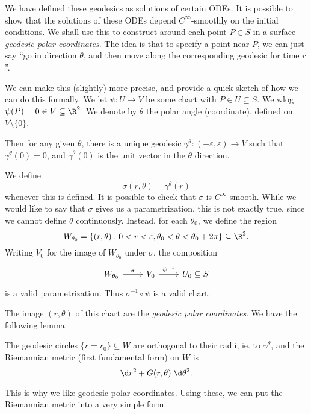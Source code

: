 \documentclass[a4paper]{article}
\begin{document}
We have defined these geodesics as solutions of certain ODEs. It is possible to show that the solutions of these ODEs depend $C^\infty$-smoothly on the initial conditions. We shall use this to construct around each point $P \in S$ in a surface \emph{geodesic polar coordinates}. The idea is that to specify a point near $P$, we can just say ``go in direction $\theta$, and then move along the corresponding geodesic for time $r$''.

We can make this (slightly) more precise, and provide a quick sketch of how we can do this formally. We let $\psi: U \to V$ be some chart with $P \in U \subseteq S$. We wlog $\psi(P) = 0 \in V \subseteq \R^2$. We denote by $\theta$ the polar angle (coordinate), defined on $V \setminus \{0\}$.
\begin{center}
\end{center}
Then for any given $\theta$, there is a unique geodesic $\gamma^{\theta}: (-\varepsilon, \varepsilon) \to V$ such that $\gamma^{\theta}(0) = 0$, and $\dot{\gamma}^\theta(0)$ is the unit vector in the $\theta$ direction.

We define
\[
  \sigma(r, \theta) = \gamma^\theta(r)
\]
whenever this is defined. It is possible to check that $\sigma$ is $C^\infty$-smooth. While we would like to say that $\sigma$ gives us a parametrization, this is not exactly true, since we cannot define $\theta$ continuously. Instead, for each $\theta_0$, we define the region
\[
  W_{\theta_0} = \{(r, \theta): 0 < r < \varepsilon, \theta_0 < \theta < \theta_0 + 2\pi\} \subseteq \R^2.
\]
Writing $V_0$ for the image of $W_{\theta_0}$ under $\sigma$, the composition
\[
  \begin{tikzcd}
    W_{\theta_0} \ar[r, "\sigma"] & V_0 \ar[r, "\psi^{-1}"] & U_0 \subseteq S
  \end{tikzcd}
\]
is a valid parametrization. Thus $\sigma^{-1} \circ \psi$ is a valid chart.

The image $(r, \theta)$ of this chart are the \emph{geodesic polar coordinates}. We have the following lemma:

\begin{lemma}
  The geodesic circles $\{r = r_0\} \subseteq W$ are orthogonal to their radii, ie. to $\gamma^\theta$, and the Riemannian metric (first fundamental form) on $W$ is
  \[
    \d r^2 + G(r, \theta) \;\d \theta^2.
  \]
\end{lemma}
This is why we like geodesic polar coordinates. Using these, we can put the Riemannian metric into a very simple form.
\end{document}
